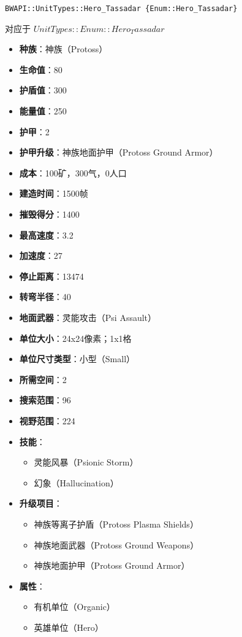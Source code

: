 \begin{tcolorbox}[colback=white, colframe=black!60!white, title=Hero\_Tassadar(), arc=0mm]
    \begin{verbatim}
BWAPI::UnitTypes::Hero_Tassadar {Enum::Hero_Tassadar}
    \end{verbatim}
    对应于  $ UnitTypes::Enum::Hero_Tassadar $ 
    \begin{itemize}
        \item \textbf{种族}：神族（Protoss）
        \item \textbf{生命值}：80
        \item \textbf{护盾值}：300
        \item \textbf{能量值}：250
        \item \textbf{护甲}：2
        \item \textbf{护甲升级}：神族地面护甲（Protoss Ground Armor）
        \item \textbf{成本}：100矿，300气，0人口
        \item \textbf{建造时间}：1500帧
        \item \textbf{摧毁得分}：1400
        \item \textbf{最高速度}：3.2
        \item \textbf{加速度}：27
        \item \textbf{停止距离}：13474
        \item \textbf{转弯半径}：40
        \item \textbf{地面武器}：灵能攻击（Psi Assault）
        \item \textbf{单位大小}：24x24像素；1x1格
        \item \textbf{单位尺寸类型}：小型（Small）
        \item \textbf{所需空间}：2
        \item \textbf{搜索范围}：96
        \item \textbf{视野范围}：224
        \item \textbf{技能}：
            \begin{itemize}
                \item 灵能风暴（Psionic Storm）
                \item 幻象（Hallucination）
            \end{itemize}
        \item \textbf{升级项目}：
            \begin{itemize}
                \item 神族等离子护盾（Protoss Plasma Shields）
                \item 神族地面武器（Protoss Ground Weapons）
                \item 神族地面护甲（Protoss Ground Armor）
            \end{itemize}
        \item \textbf{属性}：
            \begin{itemize}
                \item 有机单位（Organic）
                \item 英雄单位（Hero）
            \end{itemize}
    \end{itemize}
\end{tcolorbox}

